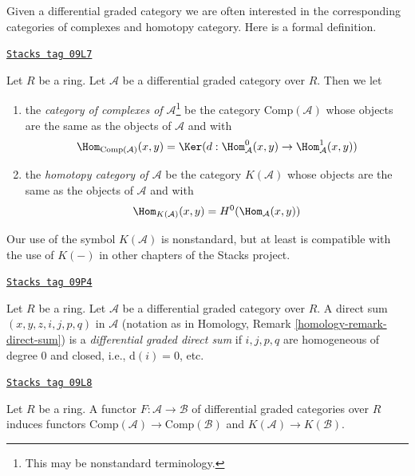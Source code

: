 Given a differential graded category we are often interested in the
corresponding categories of complexes and homotopy category.
Here is a formal definition.

\begin{definition}
\label{dga-definition-homotopy-category-of-dga-category}
\href{https://stacks.math.columbia.edu/tag/09L7}{\texttt{Stacks tag 09L7}}

Let $R$ be a ring. Let $\mathcal{A}$ be a differential graded category
over $R$. Then we let
\begin{enumerate}
\item the {\it category of complexes of $\mathcal{A}$}\footnote{This may
be nonstandard terminology.} be the category
$\text{Comp}(\mathcal{A})$ whose objects are the same as the objects
of $\mathcal{A}$ and with
$$
\Hom_{\text{Comp}(\mathcal{A})}(x, y) =
\Ker(d : \Hom^0_\mathcal{A}(x, y) \to \Hom^1_\mathcal{A}(x, y))
$$
\item the {\it homotopy category of $\mathcal{A}$} be the category
$K(\mathcal{A})$ whose objects are the same as the objects
of $\mathcal{A}$ and with
$$
\Hom_{K(\mathcal{A})}(x, y) = H^0(\Hom_\mathcal{A}(x, y))
$$
\end{enumerate}
\end{definition}

Our use of the symbol $K(\mathcal{A})$ is nonstandard, but at least
is compatible with the use of $K(-)$ in other chapters of the Stacks project.

\begin{definition}
\label{dga-definition-dg-direct-sum}
\href{https://stacks.math.columbia.edu/tag/09P4}{\texttt{Stacks tag 09P4}}

Let $R$ be a ring. Let $\mathcal{A}$ be a differential graded category over
$R$. A direct sum $(x, y, z, i, j, p, q)$ in $\mathcal{A}$ (notation as in
Homology, Remark \ref{homology-remark-direct-sum})
is a {\it differential graded direct sum} if $i, j, p, q$ are homogeneous
of degree $0$ and closed, i.e., $\text{d}(i) = 0$, etc.
\end{definition}

\begin{lemma}[Functorial]
\label{dga-lemma-functorial}
\href{https://stacks.math.columbia.edu/tag/09L8}{\texttt{Stacks tag 09L8}}

Let $R$ be a ring. A functor $F : \mathcal{A} \to \mathcal{B}$
of differential graded categories over $R$ induces functors
$\text{Comp}(\mathcal{A}) \to \text{Comp}(\mathcal{B})$
and $K(\mathcal{A}) \to K(\mathcal{B})$.
\end{lemma}

